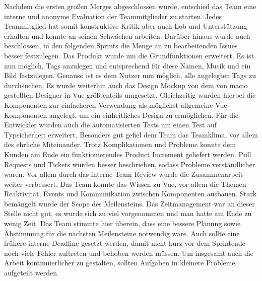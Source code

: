 \documentclass[10pt, a4paper]{article}
\begin{document}
Nachdem die ersten großen Merges abgeschlossen wurde, entschied das Team eine interne und anonyme Evaluation der Teammitglieder zu starten.
Jedes Teammitglied hat somit konstruktive Kritik aber auch Lob und Unterstützung erhalten und konnte an seinen Schwächen arbeiten.
Darüber hinaus wurde auch beschlossen, in den folgenden Sprints die Menge an zu bearbeitenden Issues besser festzulegen.
Das Produkt wurde um die Grundfunktionen erweitert.
Es ist nun möglich, Tags anzulegen und entsprechend für diese Namen, Musik und ein Bild festzulegen.
Genauso ist es dem Nutzer nun möglich, alle angelegten Tags zu durchsuchen.
Es wurde weiterhin auch das Design Mockup von dem von macio gestellten Designer in Vue größtenteils umgesetzt.
Gleichzeitig wurden hierbei die Komponenten zur einfacheren Verwendung als möglichst allgemeine Vue Komponenten angelegt, um ein einheitliches Design zu ermöglichen.
Für die Entwickler wurden auch die automatisierten Tests um einen Test auf Typsicherheit erweitert.
Besonders gut gefiel dem Team das Teamklima, vor allem des ehrliche Miteinander.
Trotz Komplikationen und Probleme konnte dem Kunden am Ende ein funktionierendes Product Increment geliefert werden.
Pull Requests und Tickets wurden besser beschrieben, sodass Probleme verständlicher waren.
Vor allem durch das interne Team Review wurde die Zusammenarbeit weiter verbessert.
Das Team konnte das Wissen zu Vue, vor allem die Themen Reaktivität, Events und Kommunikation zwischen Komponenten ausbauen.
Stark bemängelt wurde der Scope des Meilensteins.
Das Zeitmanagement war an dieser Stelle nicht gut, es wurde sich zu viel vorgenommen und man hatte am Ende zu wenig Zeit.
Das Team stimmte hier überein, dass eine bessere Planung sowie Abstimmung für die nächsten Meilensteine notwendig wäre.
Auch sollte eine frühere interne Deadline gesetzt werden, damit nicht kurz vor dem Sprintende noch viele Fehler auftreten und behoben werden müssen.
Um insgesamt auch die Arbeit kontinuierlicher zu gestalten, sollten Aufgaben in kleinere Probleme aufgeteilt werden.
\end{document}
